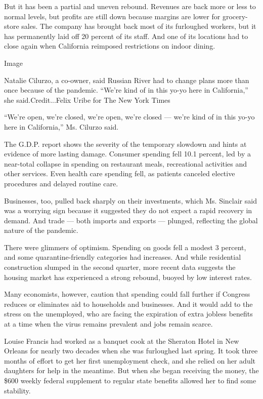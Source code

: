But it has been a partial and uneven rebound. Revenues are back more or
less to normal levels, but profits are still down because margins are
lower for grocery-store sales. The company has brought back most of its
furloughed workers, but it has permanently laid off 20 percent of its
staff. And one of its locations had to close again when California
reimposed restrictions on indoor dining.

Image

Natalie Cilurzo, a co-owner, said Russian River had to change plans more
than once because of the pandemic. ``We're kind of in this yo-yo here in
California,'' she said.Credit...Felix Uribe for The New York Times

``We're open, we're closed, we're open, we're closed --- we're kind of
in this yo-yo here in California,'' Ms. Cilurzo said.

The G.D.P. report shows the severity of the temporary slowdown and hints
at evidence of more lasting damage. Consumer spending fell 10.1 percent,
led by a near-total collapse in spending on restaurant meals,
recreational activities and other services. Even health care spending
fell, as patients canceled elective procedures and delayed routine care.

Businesses, too, pulled back sharply on their investments, which Ms.
Sinclair said was a worrying sign because it suggested they do not
expect a rapid recovery in demand. And trade --- both imports and
exports --- plunged, reflecting the global nature of the pandemic.

There were glimmers of optimism. Spending on goods fell a modest 3
percent, and some quarantine-friendly categories had increases. And
while residential construction slumped in the second quarter, more
recent data suggests the housing market has experienced a strong
rebound, buoyed by low interest rates.

Many economists, however, caution that spending could fall further if
Congress reduces or eliminates aid to households and businesses. And it
would add to the stress on the unemployed, who are facing the expiration
of extra jobless benefits at a time when the virus remains prevalent and
jobs remain scarce.

Louise Francis had worked as a banquet cook at the Sheraton Hotel in New
Orleans for nearly two decades when she was furloughed last spring. It
took three months of effort to get her first unemployment check, and she
relied on her adult daughters for help in the meantime. But when she
began receiving the money, the \$600 weekly federal supplement to
regular state benefits allowed her to find some stability.

